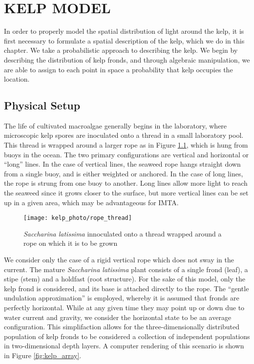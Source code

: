 \chapter{KELP MODEL}
\label{chap:kelp}

In order to properly model the spatial distribution of light around the kelp, it is first necessary to formulate a spatial description of the kelp, which we do in this chapter.
We take a probabilistic approach to describing the kelp.
We begin by describing the distribution of kelp fronds, and through algebraic manipulation, we are able to assign to each point in space a probability that kelp occupies the location.


\section{Physical Setup}
The life of cultivated macroalgae generally begins in the laboratory, where microscopic kelp spores are inoculated onto a thread in a small laboratory pool.
This thread is wrapped around a larger rope as in Figure \ref{fig:rope_thread}, which is hung from buoys in the ocean.
The two primary configurations are vertical and horizontal or ``long'' lines.
In the case of vertical lines, the seaweed rope hangs straight down from a single buoy, and is either weighted or anchored.
In the case of long lines, the rope is strung from one buoy to another.
Long lines allow more light to reach the seaweed since it grows closer to the surface, but more vertical lines can be set up in a given area,
which may be advantageous for IMTA.

\begin{figure}[H]
  \centering
  \texttt{[image: kelp\_photo/rope\_thread]}
  \caption{\textit{Saccharina latissima} innoculated onto a thread wrapped around a rope on which it is to be grown}
  \label{fig:rope_thread}
\end{figure}

We consider only the case of a rigid vertical rope which does not sway in the current.
The mature \textit{Saccharina latissima} plant consists of a single frond (leaf), a stipe (stem) and a holdfast (root structure).
For the sake of this model, only the kelp frond is considered, and its base is attached directly to the rope.
The ``gentle undulation approximation'' is employed, whereby it is assumed that fronds are perfectly horizontal.
While at any given time they may point up or down due to water current and gravity, we consider the horizontal
state to be an average configuration.
This simplifaction allows for the three-dimensionally distributed population of kelp fronds
to be considered a collection of independent populations in two-dimensional depth layers.
A computer rendering of this scenario is shown in Figure \ref{fig:kelp_array}.

